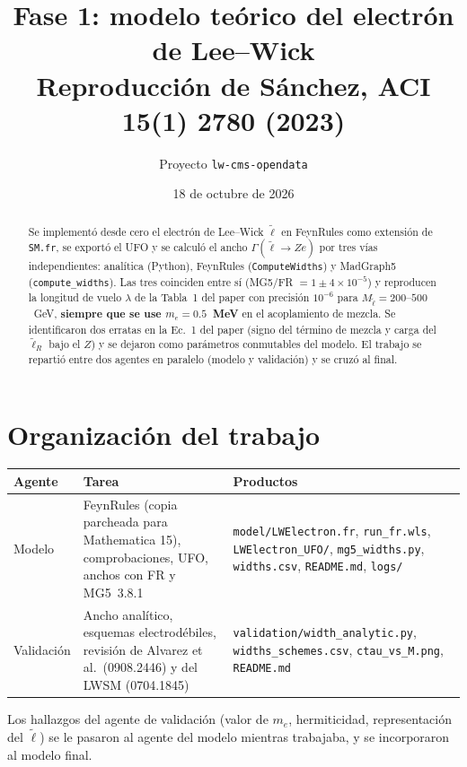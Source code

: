 \documentclass[11pt,a4paper]{article}
\title{\textbf{Fase 1: modelo teórico del electrón de Lee--Wick}\\[3pt]
\large Reproducción de Sánchez, ACI \textbf{15}(1) 2780 (2023)}
\author{Proyecto \texttt{lw-cms-opendata}}
\date{18 de octubre de 2026}
\newcommand{\lt}{\tilde{\ell}}
\begin{document}
\maketitle

\begin{abstract}
\noindent Se implementó desde cero el electrón de Lee--Wick $\lt$ en FeynRules como extensión de \texttt{SM.fr}, se exportó el UFO y se calculó el ancho $\Gamma(\lt\to Ze)$ por tres vías independientes: analítica (Python), FeynRules (\texttt{ComputeWidths}) y MadGraph5 (\texttt{compute\_widths}). Las tres coinciden entre sí (MG5/FR $=1\pm4\times10^{-5}$) y reproducen la longitud de vuelo $\lambda$ de la Tabla~1 del paper con precisión $10^{-6}$ para $M_{\lt}=200$--$500$~GeV, \textbf{siempre que se use $m_e=0.5$~MeV} en el acoplamiento de mezcla. Se identificaron dos erratas en la Ec.~1 del paper (signo del término de mezcla y carga del $\lt_R$ bajo el $Z$) y se dejaron como parámetros conmutables del modelo. El trabajo se repartió entre dos agentes en paralelo (modelo y validación) y se cruzó al final.
\end{abstract}

\section{Organización del trabajo}
\begin{center}
\small
\begin{tabular}{>{\raggedright\arraybackslash}p{3.2cm}>{\raggedright\arraybackslash}p{6.0cm}>{\raggedright\arraybackslash}p{5.4cm}}
\toprule
Agente & Tarea & Productos\\
\midrule
Modelo & FeynRules (copia parcheada para Mathematica 15), comprobaciones, UFO, anchos con FR y MG5~3.8.1 & \texttt{model/LWElectron.fr}, \texttt{run\_fr.wls}, \texttt{LWElectron\_UFO/}, \texttt{mg5\_widths.py}, \texttt{widths.csv}, \texttt{README.md}, \texttt{logs/}\\
Validación & Ancho analítico, esquemas electrodébiles, revisión de Alvarez et al.\ (0908.2446) y del LWSM (0704.1845) & \texttt{validation/width\_analytic.py}, \texttt{widths\_schemes.csv}, \texttt{ctau\_vs\_M.png}, \texttt{README.md}\\
\bottomrule
\end{tabular}
\end{center}
Los hallazgos del agente de validación (valor de $m_e$, hermiticidad, representación del $\lt$) se le pasaron al agente del modelo mientras trabajaba, y se incorporaron al modelo final.
\end{document}
